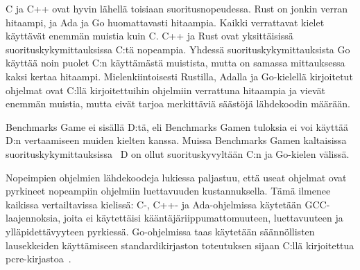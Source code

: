 C ja C++ ovat hyvin lähellä toisiaan suoritusnopeudessa. Rust on jonkin verran
hitaampi, ja Ada ja Go huomattavasti hitaampia. Kaikki verrattavat kielet
käyttävät enemmän muistia kuin C. C++ ja Rust ovat yksittäisissä
suorituskykymittauksissa C:tä nopeampia. Yhdessä suorituskykymittauksista Go
käyttää noin puolet C:n käyttämästä muistista, mutta on samassa mittauksessa
kaksi kertaa hitaampi. Mielenkiintoisesti Rustilla, Adalla ja Go-kielellä
kirjoitetut ohjelmat ovat C:llä kirjoitettuihin ohjelmiin verrattuna hitaampia
ja vievät enemmän muistia, mutta eivät tarjoa merkittäviä säästöjä lähdekoodin
määrään.

Benchmarks Game ei sisällä D:tä, eli Benchmarks Gamen tuloksia ei voi käyttää
D:n vertaamiseen muiden kielten kanssa. Muissa Benchmarks Gamen kaltaisissa
suorituskykymittauksissa~\citep[kuten][D on merkitty toteutuksesta riippuen
joko DMD, LDC tai GDC]{kostya} D on ollut suorituskyvyltään C:n ja Go-kielen
välissä.

Nopeimpien ohjelmien lähdekoodeja lukiessa paljastuu, että useat ohjelmat ovat
pyrkineet nopeampiin ohjelmiin luettavuuden kustannuksella. Tämä ilmenee
kaikissa vertailtavissa kielissä: C-, C++- ja Ada-ohjelmissa käytetään
GCC-laajennoksia, joita ei käytettäisi kääntäjäriippumattomuuteen,
luettavuuteen ja ylläpidettävyyteen pyrkiessä. Go-ohjelmissa taas käytetään
säännöllisten lausekkeiden käyttämiseen standardikirjaston toteutuksen sijaan
C:llä kirjoitettua pcre-kirjastoa~\citep{pcre}.

\FloatBarrier

\null
